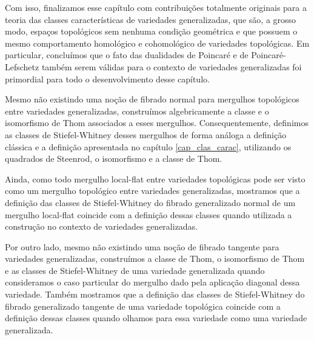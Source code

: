 \documentclass[12pt,oneside]{book} %
\begin{document}
\par Com isso, finalizamos esse capítulo com contribuições totalmente originais para a teoria das classes características de variedades generalizadas, que são, a grosso modo, espaços topológicos sem nenhuma condição geométrica e que possuem o mesmo comportamento homológico e cohomológico de variedades topológicas. Em particular, concluímos que o fato das dualidades de Poincaré e de Poincaré-Lefschetz também serem válidas para o contexto de variedades generalizadas foi primordial para todo o desenvolvimento desse capítulo.

\par Mesmo não existindo uma noção de fibrado normal para mergulhos topológicos entre variedades generalizadas, construímos algebricamente a classe e o isomorfismo de Thom associados a esses mergulhos. Consequentemente, definimos as classes de Stiefel-Whitney desses mergulhos de forma análoga a definição clássica e a definição apresentada no capítulo \ref{cap_clas_carac}, utilizando os quadrados de Steenrod, o isomorfismo e a classe de Thom.

\par Ainda, como todo mergulho local-flat entre variedades topológicas pode ser visto como um mergulho topológico entre variedades generalizadas, mostramos que a definição das classes de Stiefel-Whitney do fibrado generalizado normal de um mergulho local-flat coincide com a definição dessas classes quando utilizada a construção no contexto de variedades generalizadas.

\par Por outro lado, mesmo não existindo uma noção de fibrado tangente para variedades generalizadas, construímos a classe de Thom, o isomorfismo de Thom e as classes de Stiefel-Whitney de uma variedade generalizada quando consideramos o caso particular do mergulho dado pela aplicação diagonal dessa variedade. Também mostramos que a definição das classes de Stiefel-Whitney do fibrado generalizado tangente de uma variedade topológica coincide com a definição dessas classes quando olhamos para essa variedade como uma variedade generalizada.
\end{document}
